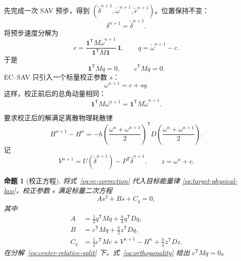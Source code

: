 \documentclass[UTF8,11pt,a4paper]{ctexart}
\newtheorem{proposition}[theorem]{命题}
\theoremstyle{definition}
\theoremstyle{remark}
\newcommand{\trans}{\mathsf{T}}
\newcommand{\ones}{\bm{1}}
\newcommand{\wtomega}{\widetilde{\omega}}
\newcommand{\wtdelta}{\widetilde{\delta}}
\begin{document}
先完成一次 SAV 预步，得到
\((\wtdelta^{n+1},\wtomega^{n+1},\widetilde r^{n+1})\)。位置保持不变：
\begin{equation}
  \delta^{n+1}=\wtdelta^{n+1}.
\end{equation}
将预步速度分解为
\begin{equation}
  c=\frac{\ones^{\trans}M\wtomega^{n+1}}
          {\ones^{\trans}M\ones}\,\ones,
  \qquad
  q=\wtomega^{n+1}-c.
  \label{eq:center-relative-split}
\end{equation}
于是
\begin{equation}
  \ones^{\trans}Mq=0,
  \qquad
  c^{\trans}Mq=0.
  \label{eq:orthogonality}
\end{equation}
EC--SAV 只引入一个标量校正参数 \(s\)：
\begin{equation}
  \omega^{n+1}=c+s q.
  \label{eq:ec-correction}
\end{equation}
这样，校正前后的总角动量相同：
\begin{equation}
  \ones^{\trans}M\omega^{n+1}
  =\ones^{\trans}M\wtomega^{n+1}.
  \label{eq:momentum-preservation}
\end{equation}

要求校正后的解满足离散物理耗散律
\begin{equation}
  H^{n+1}-H^n
  =-h\left(\frac{\omega^n+\omega^{n+1}}{2}\right)^{\trans}
  D\left(\frac{\omega^n+\omega^{n+1}}{2}\right).
  \label{eq:target-physical-law}
\end{equation}
记
\begin{equation}
  V^{n+1}=U(\wtdelta^{n+1})-P^{\trans}\wtdelta^{n+1},
  \qquad z=\omega^n+c.
\end{equation}

\begin{proposition}[校正方程]
将式~\eqref{eq:ec-correction} 代入目标能量律
\eqref{eq:target-physical-law}，校正参数 \(s\) 满足标量二次方程
\begin{equation}
  \boxed{A s^2+B s+C_q=0,}
  \label{eq:scalar-quadratic}
\end{equation}
其中
\begin{align}
  A&=\frac12q^{\trans}Mq+\frac{h}{4}q^{\trans}Dq,
  \label{eq:coef-A}\\
  B&=c^{\trans}Mq+\frac{h}{2}z^{\trans}Dq,
  \label{eq:coef-B}\\
  C_q&=\frac12c^{\trans}Mc+V^{n+1}-H^n
       +\frac{h}{4}z^{\trans}Dz.
  \label{eq:coef-C}
\end{align}
在分解~\eqref{eq:center-relative-split} 下，式~\eqref{eq:orthogonality}
给出 \(c^{\trans}Mq=0\)。
\end{proposition}
\end{document}
